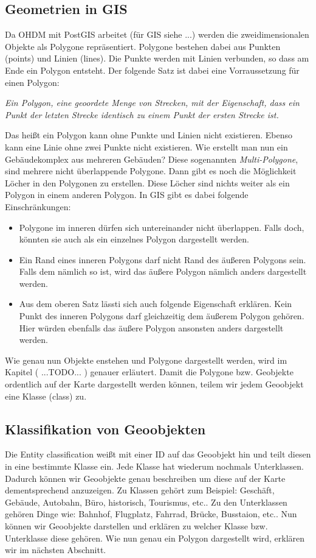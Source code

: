 \subsection{Geometrien in GIS}
Da OHDM mit PostGIS arbeitet (für GIS siehe ...) werden die zweidimensionalen Objekte als Polygone repräsentiert. Polygone bestehen dabei aus Punkten (points) und Linien (lines). Die Punkte werden mit Linien verbunden, so dass am Ende ein Polygon entsteht. Der folgende Satz ist dabei eine Vorraussetzung für einen Polygon:
\begin{center}
 \textit{Ein Polygon, eine geoordete Menge von Strecken, mit der Eigenschaft, dass ein Punkt der letzten Strecke identisch zu einem Punkt der ersten Strecke ist.}
 \end{center} 
Das heißt ein Polygon kann ohne Punkte und Linien nicht existieren. Ebenso kann eine Linie ohne zwei Punkte nicht existieren. Wie erstellt man nun ein Gebäudekomplex aus mehreren Gebäuden? Diese sogenannten \textit{Multi-Polygone}, sind mehrere nicht überlappende Polygone. Dann gibt es noch die Möglichkeit Löcher in den Polygonen zu erstellen. Diese Löcher sind nichts weiter als ein Polygon in einem anderen Polygon. In GIS gibt es dabei folgende Einschränkungen:
\begin{itemize}
\item Polygone im inneren dürfen sich untereinander nicht überlappen. Falls doch, könnten sie auch als ein einzelnes Polygon dargestellt werden.
\item Ein Rand eines inneren Polygons darf nicht Rand des äußeren Polygons sein. Falls dem nämlich so ist, wird das äußere Polygon nämlich anders dargestellt werden. %
\item Aus dem oberen Satz lässti sich auch folgende Eigenschaft erklären. Kein Punkt des inneren Polygons darf gleichzeitig dem äußerem Polygon gehören. Hier würden ebenfalls das äußere Polygon ansonsten anders dargestellt werden. %
\end{itemize}
Wie genau nun Objekte enstehen und Polygone dargestellt werden, wird im Kapitel ( ...TODO... ) genauer erläutert. Damit die Polygone bzw. Geobjekte ordentlich auf der Karte  dargestellt werden können, teilem wir jedem Geoobjekt eine Klasse (class) zu. 

\subsection{Klassifikation von Geoobjekten}
Die Entity classification weißt mit einer ID auf das Geoobjekt hin und teilt diesen in eine bestimmte Klasse ein. Jede Klasse hat wiederum nochmals Unterklassen. Dadurch können wir Geoobjekte genau beschreiben um diese auf der Karte dementsprechend anzuzeigen. Zu Klassen gehört zum Beispiel: Geschäft, Gebäude, Autobahn, Büro, historisch, Tourismus, etc.. Zu den Unterklassen gehören Dinge wie: Bahnhof, Flugplatz, Fahrrad, Brücke, Busstaion, etc.. %
Nun können wir Geoobjekte darstellen und erklären zu welcher Klasse bzw. Unterklasse diese gehören. Wie nun genau ein Polygon dargestellt wird, erklären wir im nächsten Abschnitt.

